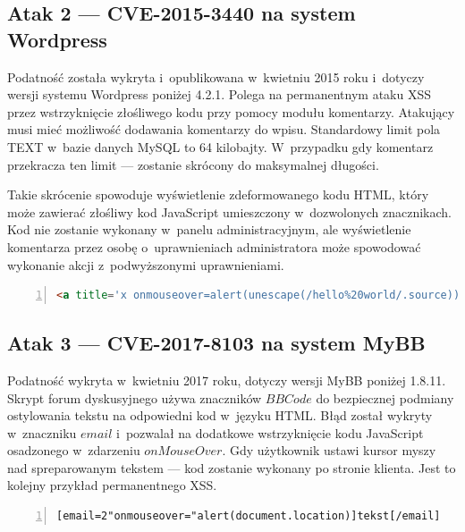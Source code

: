 \documentclass[12pt,a4paper,polish,thesis]{dcsbook}
\begin{document}
\subsection*{Atak 2 --- CVE-2015-3440 na system Wordpress}
Podatność została wykryta i~opublikowana w~kwietniu 2015 roku i~dotyczy wersji systemu Wordpress poniżej 4.2.1. Polega na permanentnym ataku XSS przez wstrzyknięcie złośliwego kodu przy pomocy modułu komentarzy. Atakujący musi mieć możliwość dodawania komentarzy do wpisu. Standardowy limit pola TEXT w~bazie danych MySQL to 64 kilobajty. W~przypadku gdy komentarz przekracza ten limit --- zostanie skrócony do maksymalnej długości. 

Takie skrócenie spowoduje wyświetlenie zdeformowanego kodu HTML, który może zawierać złośliwy kod JavaScript umieszczony w~dozwolonych znacznikach. Kod nie zostanie wykonany w~panelu administracyjnym, ale wyświetlenie komentarza przez osobę o~uprawnieniach administratora może spowodować wykonanie akcji z~podwyższonymi uprawnieniami.


\begin{lstlisting}[language=HTML,frame=single,label=testkod2,numbers=left,caption=komentarz wykorzystujący podatność CVE-2015-3440 zamieszczony przez autora]
<a title='x onmouseover=alert(unescape(/hello%20world/.source)) style=position:absolute;left:0;top:0;width:5000px;height:5000px  AAAAAAAAAAAA...[64 kb]..AAA'></a>
\end{lstlisting}


\subsection*{Atak 3 --- CVE-2017-8103 na system MyBB}
Podatność wykryta w~kwietniu 2017 roku, dotyczy wersji MyBB poniżej 1.8.11. Skrypt forum dyskusyjnego używa znaczników $BBCode$ do bezpiecznej podmiany ostylowania tekstu na odpowiedni kod w~języku HTML. Błąd został wykryty w~znaczniku $email$ i~pozwalał na dodatkowe wstrzyknięcie kodu JavaScript osadzonego w~zdarzeniu $onMouseOver$. Gdy użytkownik ustawi kursor myszy nad spreparowanym tekstem --- kod zostanie wykonany po stronie klienta. Jest to kolejny przykład permanentnego XSS.

\begin{lstlisting}[language=HTML,frame=single,label=testkod3,numbers=left,caption=znacznik wykorzystujący podatność CVE-2017-8103 zamieszczony przez autora]
[email=2"onmouseover="alert(document.location)]tekst[/email]
\end{lstlisting}
\end{document}
